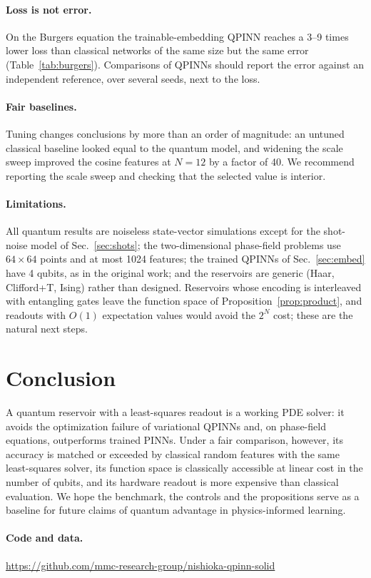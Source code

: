 \documentclass[11pt]{article}
\theoremstyle{remark}\newtheorem*{remark}{Remark}
\begin{document}
\paragraph{Loss is not error.} On the Burgers equation the trainable-embedding QPINN reaches a 3--9 times lower loss
than classical networks of the same size but the same error (Table~\ref{tab:burgers}). Comparisons of QPINNs should
report the error against an independent reference, over several seeds, next to the loss.

\paragraph{Fair baselines.} Tuning changes conclusions by more than an order of magnitude: an untuned classical baseline
looked equal to the quantum model, and widening the scale sweep improved the cosine features at $N=12$ by a factor of 40.
We recommend reporting the scale sweep and checking that the selected value is interior.

\paragraph{Limitations.} All quantum results are noiseless state-vector simulations except for the shot-noise model of
Sec.~\ref{sec:shots}; the two-dimensional phase-field problems use $64\times64$ points and at most 1024 features; the
trained QPINNs of Sec.~\ref{sec:embed} have 4 qubits, as in the original work; and the reservoirs are generic (Haar,
Clifford+T, Ising) rather than designed. Reservoirs whose encoding is interleaved with entangling gates leave the
function space of Proposition~\ref{prop:product}, and readouts with $O(1)$ expectation values would avoid the $2^N$
cost; these are the natural next steps.

\section{Conclusion}
A quantum reservoir with a least-squares readout is a working PDE solver: it avoids the optimization failure of
variational QPINNs and, on phase-field equations, outperforms trained PINNs. Under a fair comparison, however, its
accuracy is matched or exceeded by classical random features with the same least-squares solver, its function space is
classically accessible at linear cost in the number of qubits, and its hardware readout is more expensive than classical
evaluation. We hope the benchmark, the controls and the propositions serve as a baseline for future claims of quantum
advantage in physics-informed learning.

\paragraph{Code and data.} \url{https://github.com/mmc-research-group/nishioka-qpinn-solid}



\end{document}
